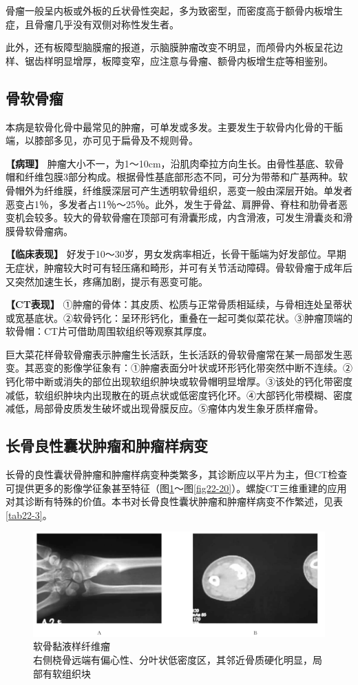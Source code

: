 骨瘤一般呈内板或外板的丘状骨性突起，多为致密型，而密度高于额骨内板增生症，且骨瘤几乎没有双侧对称性发生者。

此外，还有板障型脑膜瘤的报道，示脑膜肿瘤改变不明显，而颅骨内外板呈花边样、锯齿样明显增厚，板障变窄，应注意与骨瘤、额骨内板增生症等相鉴别。

\subsection{骨软骨瘤}

本病是软骨化骨中最常见的肿瘤，可单发或多发。主要发生于软骨内化骨的干骺端，以膝部多见，亦可见于扁骨及不规则骨。

\textbf{【病理】}
肿瘤大小不一，为1～10cm，沿肌肉牵拉方向生长。由骨性基底、软骨帽和纤维包膜3部分构成。根据骨性基底部形态不同，可分为带蒂和广基两种。软骨帽外为纤维膜，纤维膜深层可产生透明软骨组织，恶变一般由深层开始。单发者恶变占1％，多发者占11％～25％。此外，发生于骨盆、肩胛骨、脊柱和肋骨者恶变机会较多。较大的骨软骨瘤在顶部可有滑囊形成，内含滑液，可发生滑囊炎和滑膜骨软骨瘤病。

\textbf{【临床表现】}
好发于10～30岁，男女发病率相近，长骨干骺端为好发部位。早期无症状，肿瘤较大时可有轻压痛和畸形，并可有关节活动障碍。骨软骨瘤于成年后又突然加速生长，疼痛加剧，提示有恶变可能。

\textbf{【CT表现】}
①肿瘤的骨体：其皮质、松质与正常骨质相延续，与骨相连处呈蒂状或宽基底状。②软骨钙化：呈环形钙化，重叠在一起可类似菜花状。③肿瘤顶端的软骨帽：CT片可借助周围软组织等观察其厚度。

巨大菜花样骨软骨瘤表示肿瘤生长活跃，生长活跃的骨软骨瘤常在某一局部发生恶变。其恶变的影像学征象有：①肿瘤表面分叶状或环形钙化带突然中断不连续。②钙化带中断或消失的部位出现软组织肿块或软骨帽明显增厚。③该处的钙化带密度减低，软组织肿块内出现散在的斑点状或低密度钙化环。④大部钙化带模糊、密度减低，局部骨皮质发生破坏或出现骨膜反应。⑤瘤体内发生象牙质样瘤骨。

\subsection{长骨良性囊状肿瘤和肿瘤样病变}

长骨的良性囊状骨肿瘤和肿瘤样病变种类繁多，其诊断应以平片为主，但CT检查可提供更多的影像学征象甚至特征（图\ref{fig22-17}～图\ref{fig22-20}）。螺旋CT三维重建的应用对其诊断有特殊的价值。本书对长骨良性囊状肿瘤和肿瘤样病变不作繁述，见表\ref{tab22-3}。

\begin{figure}[!htbp]
 \centering
 \includegraphics[width=.7\textwidth,height=\textheight,keepaspectratio]{./images/Image00436.jpg}
 \captionsetup{justification=centering}
 \caption{软骨黏液样纤维瘤\\{\small 右侧桡骨远端有偏心性、分叶状低密度区，其邻近骨质硬化明显，局部有软组织块}}
 \label{fig22-17}
  \end{figure} 


